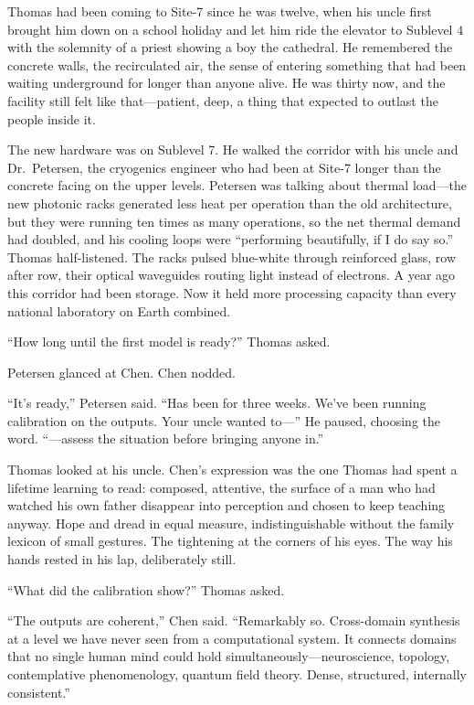 Thomas had been coming to Site-7 since he was twelve, when his uncle first brought him down on a school holiday and let him ride the elevator to Sublevel 4 with the solemnity of a priest showing a boy the cathedral. He remembered the concrete walls, the recirculated air, the sense of entering something that had been waiting underground for longer than anyone alive. He was thirty now, and the facility still felt like that---patient, deep, a thing that expected to outlast the people inside it.

The new hardware was on Sublevel 7. He walked the corridor with his uncle and Dr.\ Petersen, the cryogenics engineer who had been at Site-7 longer than the concrete facing on the upper levels. Petersen was talking about thermal load---the new photonic racks generated less heat per operation than the old architecture, but they were running ten times as many operations, so the net thermal demand had doubled, and his cooling loops were ``performing beautifully, if I do say so.'' Thomas half-listened. The racks pulsed blue-white through reinforced glass, row after row, their optical waveguides routing light instead of electrons. A year ago this corridor had been storage. Now it held more processing capacity than every national laboratory on Earth combined.

``How long until the first model is ready?'' Thomas asked.

Petersen glanced at Chen. Chen nodded.

``It's ready,'' Petersen said. ``Has been for three weeks. We've been running calibration on the outputs. Your uncle wanted to---'' He paused, choosing the word. ``---assess the situation before bringing anyone in.''

Thomas looked at his uncle. Chen's expression was the one Thomas had spent a lifetime learning to read: composed, attentive, the surface of a man who had watched his own father disappear into perception and chosen to keep teaching anyway. Hope and dread in equal measure, indistinguishable without the family lexicon of small gestures. The tightening at the corners of his eyes. The way his hands rested in his lap, deliberately still.

``What did the calibration show?'' Thomas asked.

``The outputs are coherent,'' Chen said. ``Remarkably so. Cross-domain synthesis at a level we have never seen from a computational system. It connects domains that no single human mind could hold simultaneously---neuroscience, topology, contemplative phenomenology, quantum field theory. Dense, structured, internally consistent.''

